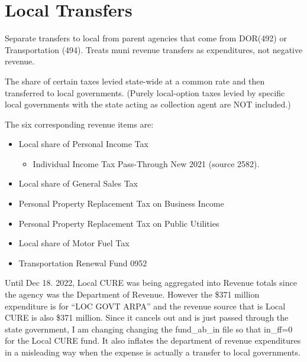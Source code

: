 \documentclass[
  letterpaper,
  DIV=11,
  numbers=noendperiod]{scrreport}
\providecommand{\tightlist}{%
  \setlength{\itemsep}{0pt}\setlength{\parskip}{0pt}}\usepackage{longtable,booktabs,array}
\begin{document}
\hypertarget{local-transfers}{%
\chapter{Local Transfers}\label{local-transfers}}

Separate transfers to local from parent agencies that come from DOR(492)
or Transportation (494). Treats muni revenue transfers as expenditures,
not negative revenue.

The share of certain taxes levied state-wide at a common rate and then
transferred to local governments. (Purely local-option taxes levied by
specific local governments with the state acting as collection agent are
NOT included.)

The six corresponding revenue items are:

\begin{itemize}
\tightlist
\item
  Local share of Personal Income Tax

  \begin{itemize}
  \tightlist
  \item
    Individual Income Tax Pass-Through New 2021 (source 2582).
  \end{itemize}
\item
  Local share of General Sales Tax
\item
  Personal Property Replacement Tax on Business Income
\item
  Personal Property Replacement Tax on Public Utilities
\item
  Local share of Motor Fuel Tax
\item
  Transportation Renewal Fund 0952
\end{itemize}

Until Dec 18. 2022, Local CURE was being aggregated into Revenue totals
since the agency was the Department of Revenue. However the \$371
million expenditure is for ``LOC GOVT ARPA'' and the revenue source that
is Local CURE is also \$371 million. Since it cancels out and is just
passed through the state government, I am changing changing the
fund\_ab\_in file so that in\_ff=0 for the Local CURE fund. It also
inflates the department of revenue expenditures in a misleading way when
the expense is actually a transfer to local governments.
\end{document}
